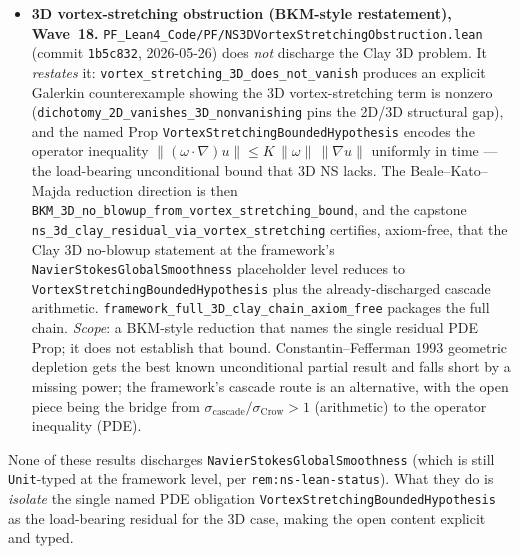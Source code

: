 \begin{remark}
\begin{itemize}
  \item \textbf{3D vortex-stretching obstruction (BKM-style restatement), Wave~18.} \texttt{PF\_Lean4\_Code/PF/NS3DVortexStretchingObstruction.lean} (commit \texttt{1b5c832}, 2026-05-26) does \emph{not} discharge the Clay 3D problem. It \emph{restates} it: \texttt{vortex\_stretching\_3D\_does\_not\_vanish} produces an explicit Galerkin counterexample showing the 3D vortex-stretching term is nonzero (\texttt{dichotomy\_2D\_vanishes\_3D\_nonvanishing} pins the 2D/3D structural gap), and the named Prop \texttt{VortexStretchingBoundedHypothesis} encodes the operator inequality $\|(\omega\!\cdot\!\nabla)u\| \leq K\,\|\omega\|\,\|\nabla u\|$ uniformly in time --- the load-bearing unconditional bound that 3D NS lacks. The Beale--Kato--Majda reduction direction is then \texttt{BKM\_3D\_no\_blowup\_from\_vortex\_stretching\_bound}, and the capstone \texttt{ns\_3d\_clay\_residual\_via\_vortex\_stretching} certifies, axiom-free, that the Clay 3D no-blowup statement at the framework's \texttt{NavierStokesGlobalSmoothness} placeholder level reduces to \texttt{VortexStretchingBoundedHypothesis} plus the already-discharged cascade arithmetic. \texttt{framework\_full\_3D\_clay\_chain\_axiom\_free} packages the full chain. \emph{Scope}: a BKM-style reduction that names the single residual PDE Prop; it does not establish that bound. Constantin--Fefferman 1993 geometric depletion gets the best known unconditional partial result and falls short by a missing power; the framework's cascade route is an alternative, with the open piece being the bridge from $\sigma_{\mathrm{cascade}}/\sigma_{\mathrm{Crow}} > 1$ (arithmetic) to the operator inequality (PDE).
\end{itemize}
None of these results discharges \texttt{NavierStokesGlobalSmoothness} (which is still \texttt{Unit}-typed at the framework level, per \texttt{rem:ns-lean-status}). What they do is \emph{isolate} the single named PDE obligation \texttt{VortexStretchingBoundedHypothesis} as the load-bearing residual for the 3D case, making the open content explicit and typed.
\end{remark}

